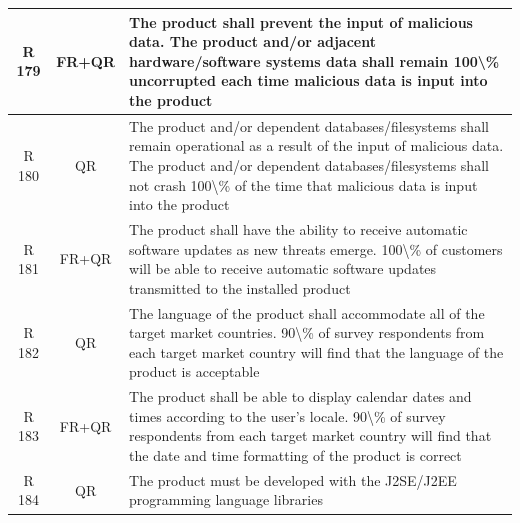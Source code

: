 \documentclass[dissertation,final]{softeng}
\begin{document}
\begin{appendices}
\begin{center}
\begin{longtable}{c c m{}}
    R 179   & FR+QR & The product shall prevent the input of malicious data. The product and/or adjacent hardware/software systems data shall remain 100\textbackslash{}\% uncorrupted each time malicious data is input into the product \\    \midrule
    R 180   & QR & The product and/or dependent databases/filesystems shall remain operational as a result of the input of malicious data. The product and/or dependent databases/filesystems shall not crash 100\textbackslash{}\% of the time that malicious data is input into the product \\    \midrule
    R 181   & FR+QR & The product shall have the ability to receive automatic software updates as new threats emerge. 100\textbackslash{}\% of customers will be able to receive automatic software updates transmitted to the installed product \\    \midrule
    R 182   & QR & The language of the product shall accommodate all of the target market countries. 90\textbackslash{}\% of survey respondents from each target market country will find that the language of the product is acceptable \\    \midrule
    R 183   & FR+QR & The product shall be able to display calendar dates and times according to the user's locale. 90\textbackslash{}\% of survey respondents from each target market country will find that the date and time formatting of the product is correct \\    \midrule
    R 184   & QR & The product must be developed with the J2SE/J2EE programming language libraries \\
\end{longtable}
\end{center}


\end{appendices}
\end{document}
